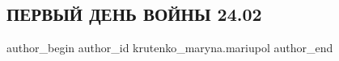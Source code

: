  
 
 
 
 

\subsection{ПЕРВЫЙ ДЕНЬ ВОЙНЫ 24.02}
\label{sec:24_02_2023.fb.krutenko_maryna.mariupol.1.pervii_den_voini_24_}

\ifcmt
 author_begin
   author_id krutenko_maryna.mariupol
 author_end
\fi
